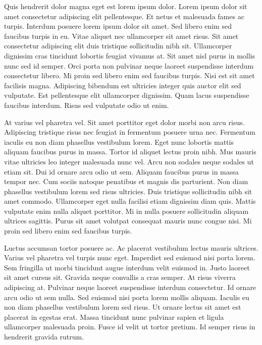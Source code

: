 \documentclass[11pt,a4paper]{article}
\begin{document}
Quis hendrerit dolor magna eget est lorem ipsum dolor. Lorem ipsum dolor sit amet consectetur adipiscing elit pellentesque. Et netus et malesuada fames ac turpis. Interdum posuere lorem ipsum dolor sit amet. Sed libero enim sed faucibus turpis in eu. Vitae aliquet nec ullamcorper sit amet risus. Sit amet consectetur adipiscing elit duis tristique sollicitudin nibh sit. Ullamcorper dignissim cras tincidunt lobortis feugiat vivamus at. Sit amet nisl purus in mollis nunc sed id semper. Orci porta non pulvinar neque laoreet suspendisse interdum consectetur libero. Mi proin sed libero enim sed faucibus turpis. Nisi est sit amet facilisis magna. Adipiscing bibendum est ultricies integer quis auctor elit sed vulputate. Est pellentesque elit ullamcorper dignissim. Quam lacus suspendisse faucibus interdum. Risus sed vulputate odio ut enim.

At varius vel pharetra vel. Sit amet porttitor eget dolor morbi non arcu risus. Adipiscing tristique risus nec feugiat in fermentum posuere urna nec. Fermentum iaculis eu non diam phasellus vestibulum lorem. Eget nunc lobortis mattis aliquam faucibus purus in massa. Tortor id aliquet lectus proin nibh. Mus mauris vitae ultricies leo integer malesuada nunc vel. Arcu non sodales neque sodales ut etiam sit. Dui id ornare arcu odio ut sem. Aliquam faucibus purus in massa tempor nec. Cum sociis natoque penatibus et magnis dis parturient. Non diam phasellus vestibulum lorem sed risus ultricies. Duis tristique sollicitudin nibh sit amet commodo. Ullamcorper eget nulla facilisi etiam dignissim diam quis. Mattis vulputate enim nulla aliquet porttitor. Mi in nulla posuere sollicitudin aliquam ultrices sagittis. Purus sit amet volutpat consequat mauris nunc congue nisi. Mi proin sed libero enim sed faucibus turpis.

Luctus accumsan tortor posuere ac. Ac placerat vestibulum lectus mauris ultrices. Varius vel pharetra vel turpis nunc eget. Imperdiet sed euismod nisi porta lorem. Sem fringilla ut morbi tincidunt augue interdum velit euismod in. Justo laoreet sit amet cursus sit. Gravida neque convallis a cras semper. At risus viverra adipiscing at. Pulvinar neque laoreet suspendisse interdum consectetur. Id ornare arcu odio ut sem nulla. Sed euismod nisi porta lorem mollis aliquam. Iaculis eu non diam phasellus vestibulum lorem sed risus. Ut ornare lectus sit amet est placerat in egestas erat. Massa tincidunt nunc pulvinar sapien et ligula ullamcorper malesuada proin. Fusce id velit ut tortor pretium. Id semper risus in hendrerit gravida rutrum.
\end{document}
